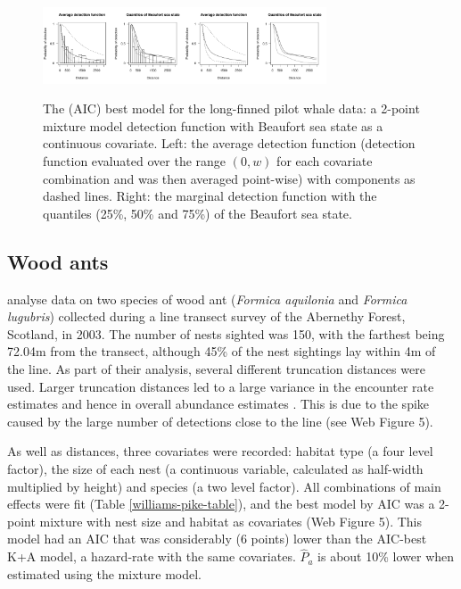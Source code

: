 \documentclass[authoryear,preprint,review,12pt]{elsarticle}
\begin{document}
\begin{figure}
\centering
\includegraphics[width=0.375\textwidth, trim= 0 0 3.8in 0, clip=true]{analyses/danpike-bssc.pdf}\includegraphics[width=0.375\textwidth, trim= 3.8in 0 0 0, clip=true]{analyses/danpike-bssc-hh.pdf}
\caption{The (AIC) best model for the long-finned pilot whale data: a 2-point mixture model detection function with Beaufort sea state as a continuous covariate. Left: the average detection function (detection function evaluated over the range $(0,w)$ for each covariate combination and was then averaged point-wise) with components as dashed lines. Right: the marginal detection function with the quantiles (25\%, 50\% and 75\%) of the Beaufort sea state.}
\label{danpike-detfct}
\end{figure}


\subsection{Wood ants}
\label{s:woodant}

\cite{Borkin:2012vj} analyse data on two species of wood ant (\textit{Formica aquilonia} and \textit{Formica lugubris}) collected during a line transect survey of the Abernethy Forest, Scotland, in 2003. The number of nests sighted was 150, with the farthest being 72.04m from the transect, although 45\% of the nest sightings lay within 4m of the line. As part of their analysis, several different truncation distances were used. Larger truncation distances led to a large variance in the encounter rate estimates and hence in overall abundance estimates \citep[][]{Borkin:2012vj}. This is due to the spike caused by the large number of detections close to the line (see Web Figure 5).

As well as distances, three covariates were recorded: habitat type (a four level factor), the size of each nest (a continuous variable, calculated as half-width multiplied by height) and species (a two level factor). All combinations of main effects were fit (Table \ref{williams-pike-table}), and the best model by AIC was a 2-point mixture with nest size and habitat as covariates (Web Figure 5). This model had an AIC that was considerably (6 points) lower than the AIC-best K+A model, a hazard-rate with the same covariates.  $\hat{P}_a$ is about 10\% lower when estimated using the mixture model.
\end{document}

